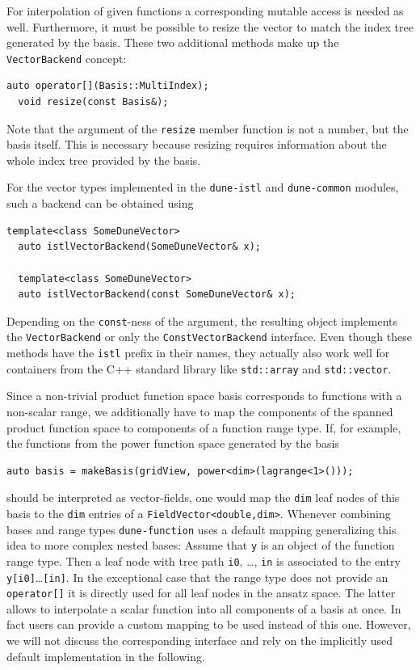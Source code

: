 \documentclass[a4paper,10pt,headings=normal,bibliography=totoc]{scrartcl}
\newcommand{\cpp}[1]{\lstinline[basicstyle=\ttfamily]!#1!}
\newcommand{\dunemodule}[1]{\texttt{#1}}
\begin{document}
For interpolation of given functions a corresponding mutable access is needed as well.
Furthermore, it must be possible to resize the vector to match
the index tree generated by the basis. These two additional methods make up the
\cpp{VectorBackend} concept:
\begin{lstlisting}[style=Interface]
  auto operator[](Basis::MultiIndex);
  void resize(const Basis&);
\end{lstlisting}
%
Note that the argument of the \cpp{resize}
member function is not a number, but the basis itself. This
is necessary because resizing requires information about the whole
index tree provided by the basis.

For the vector types implemented in the \dunemodule{dune-istl} and \dunemodule{dune-common}
modules, such a backend can be obtained using
\begin{lstlisting}[style=Interface]
  template<class SomeDuneVector>
  auto istlVectorBackend(SomeDuneVector& x);

  template<class SomeDuneVector>
  auto istlVectorBackend(const SomeDuneVector& x);
\end{lstlisting}
Depending on the \cpp{const}-ness of the argument, the resulting
object implements the \cpp{VectorBackend} or only the
\cpp{ConstVectorBackend} interface.  Even though these methods have the \cpp{istl} prefix
in their names, they actually also work well for containers from the C++ standard library
like \cpp{std::array} and \cpp{std::vector}.

Since a non-trivial product function space basis corresponds to functions with
a non-scalar range, we additionally have to map the components
of the spanned product function space to components of a function range type.
If, for example, the functions from the power function space generated by the basis
\begin{lstlisting}[style=Example]
auto basis = makeBasis(gridView, power<dim>(lagrange<1>()));
\end{lstlisting}
should be interpreted as vector-fields, one would map the \cpp{dim}
leaf nodes of this basis to the \cpp{dim} entries of a \cpp{FieldVector<double,dim>}.
Whenever combining bases and range types \dunemodule{dune-function}
uses a default mapping generalizing this idea to more complex nested bases:
Assume that \cpp{y} is an object of the function range type.
Then a leaf node with tree path \cpp{i0}, \dots, \cpp{in} is associated
to the entry \cpp{y[i0]}\dots\cpp{[in]}.
In the exceptional case that the range type does not provide an \cpp{operator[]}
it is directly used for all leaf nodes in the ansatz space. The latter allows
to interpolate a scalar function into all components of a basis at once.
In fact users can provide a custom mapping to be used instead of this one.
However, we will not discuss the corresponding interface and rely
on the implicitly used default implementation in the following.
\end{document}
